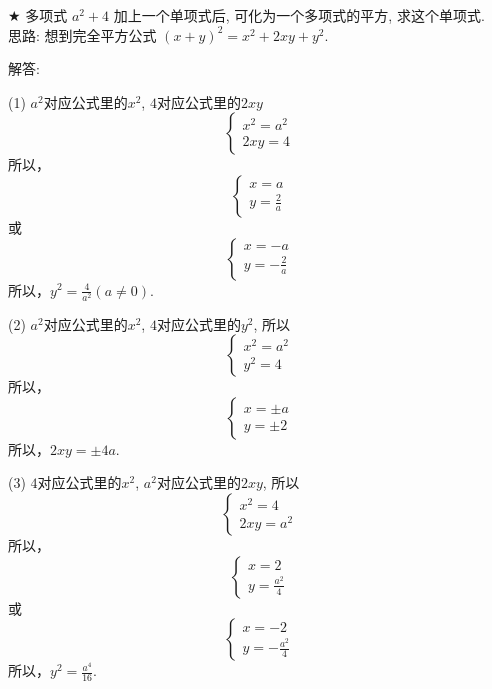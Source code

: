 \item {
    $\bigstar$
    多项式 $a^2 + 4$ 加上一个单项式后, 可化为一个多项式的平方, 求这个单项式. 
    \ifshowSolution
    \fangsong{}
    \\
    思路: 想到完全平方公式 $(x + y)^2 = x^2 + 2xy + y^2$. 

    解答: 

    (1) $a^2$对应公式里的$x^2$, $4$对应公式里的$2xy$
    \[\left\{ 
        \begin{array}{lc}
            x^2 = a^2\\
            2xy = 4
        \end{array}
    \right. \]
    所以，
    \[\left\{ 
        \begin{array}{lc}
            x = a\\
            y = \frac2a
        \end{array}
    \right. \]
    或
    \[\left\{ 
        \begin{array}{lc}
            x = -a\\
            y = -\frac2a
        \end{array}
    \right. \]
    所以，$y^2 = \frac{4}{a^2} (a\neq 0). $

    (2) $a^2$对应公式里的$x^2$, $4$对应公式里的$y^2$, 所以
    \[\left\{ 
        \begin{array}{lc}
            x^2 = a^2 \\
            y^2 = 4
        \end{array}
    \right. \]
    所以，
    \[\left\{ 
        \begin{array}{lc}
            x = \pm a \\
            y = \pm 2
        \end{array}
    \right. \]
    所以，$2xy = \pm 4a. $

    
    (3) $4$对应公式里的$x^2$, $a^2$对应公式里的$2xy$, 所以
    \[\left\{ 
        \begin{array}{lc}
            x^2 = 4 \\
            2xy = a^2
        \end{array}
    \right. \]
    所以，
    \[\left\{ 
        \begin{array}{lc}
            x = 2 \\
            y = \frac{a^2}{4}
        \end{array}
    \right. \]
    或
    \[\left\{ 
        \begin{array}{lc}
            x = -2 \\
            y = -\frac{a^2}{4}
        \end{array}
    \right. \]
    所以，$y^2 = \frac{a^4}{16}. $
    \else
        \\ \\ \\ \\ \\ \\
    \fi
}



